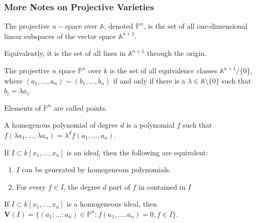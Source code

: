             \subsubsection{More Notes on Projective Varieties}
                \begin{definition}
                    The projective $n-$space over $\mathbb{A}$,
                    denoted $\mathbb{P}^{n}$, is the set of all
                    one-dimensional linear subspaces of the vector
                    space $\mathbb{A}^{n+1}$.
                \end{definition}
                Equivalently, it is the set of all lines in $\mathbb{A}^{n+1}$
                through the origin.
                \begin{definition}
                    The projective $n$ space $\mathbb{P}^{n}$ over $k$
                    is the set of all equivalence classes
                    $\mathbb{A}^{n+1}/\{0\}$, where
                    $(a_{1},\hdots,a_{n})\sim(b_{1},\hdots,b_{n})$
                    if and only if there is a
                    $\lambda\in\mathbb{A}\setminus\{0\}$
                    such that $b_{i}=\lambda{a_{i}}$.
                \end{definition}
                Elements of $\mathbb{P}^{n}$ are called points.
                \begin{definition}
                    A homogenous polynomial of degree $d$
                    is a polynomial $f$ such that
                    $f(\lambda a_1,\hdots,\lambda a_n)%
                     =\lambda^d f(a_1,\hdots, a_n)$.
                \end{definition}
                \begin{theorem}
                    If $I\subset k[x_1,\hdots ,x_n]$ is an ideal,
                    then the following are equivalent:
                    \begin{enumerate}
                        \item $I$ can be generated by
                              homogeneous polynomials.
                        \item For every $f\in I$, the degree
                              $d$ part of $f$ in contained in $I$
                    \end{enumerate}
                \end{theorem}
                \begin{definition}
                    If $I\subset k[x_1,\hdots ,x_n]$ is a
                    homogeneous ideal, then
                    $\mathbf{V}(I)%
                     =\{(a_1:\hdots:a_{n})\in\mathbb{P}^{n}:%
                     f(a_{1},\hdots,a_{n})=0,f\in I\}$.
                \end{definition}

